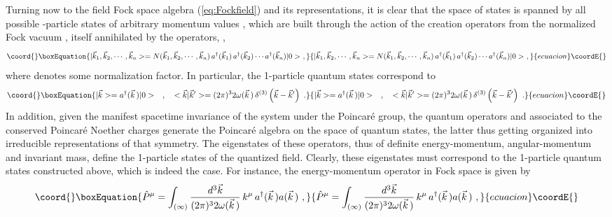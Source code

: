 \documentclass[a4paper,11pt]{article}
\begin{document}
Turning now to the field Fock space algebra (\ref{eq:Fockfield}) and
its representations, it is clear that the space of states is spanned
by all possible \coordHE{}-particle states \coordHE{} of arbitrary
momentum values \coordHE{}  \coordHE{}, which are built through the
action of the creation operators \coordHE{} from
the normalized Fock vacuum \coordHE{}, itself annihilated by the \coordHE{}
operators, \coordHE{}, 
\begin{equation}\coord{}\boxEquation{
|\vec{k}_1,\vec{k}_2,\cdots,\vec{k}_n>=
N(\vec{k}_1,\vec{k}_2,\cdots,\vec{k}_n)\,
a^\dagger(\vec{k}_1)\,a^\dagger(\vec{k}_2)\cdots a^\dagger(\vec{k}_n)|0>\ ,
}{
|\vec{k}_1,\vec{k}_2,\cdots,\vec{k}_n>=
N(\vec{k}_1,\vec{k}_2,\cdots,\vec{k}_n)\,
a^\dagger(\vec{k}_1)\,a^\dagger(\vec{k}_2)\cdots a^\dagger(\vec{k}_n)|0>\ ,
}{ecuacion}\coordE{}\end{equation}
where \coordHE{} denotes some normalization
factor. In particular, the 1-particle quantum states correspond to
\begin{equation}\coord{}\boxEquation{
|\vec{k}>=a^\dagger(\vec{k}\,)|0>\ \ \ ,\ \ \ 
<\vec{k}|\vec{k}'>=
(2\pi)^32\omega(\vec{k}\,)\,\delta^{(3)}\left(\vec{k}-\vec{k}'\right)\ .
}{
|\vec{k}>=a^\dagger(\vec{k}\,)|0>\ \ \ ,\ \ \ 
<\vec{k}|\vec{k}'>=
(2\pi)^32\omega(\vec{k}\,)\,\delta^{(3)}\left(\vec{k}-\vec{k}'\right)\ .
}{ecuacion}\coordE{}\end{equation}
In addition, given the manifest spacetime invariance of the system under
the Poincar\'e group, the quantum operators \coordHE{} and 
\myHighlight{$\hat{M}^{\mu\nu}$}\coordHE{} associated to the conserved Poincar\'e Noether charges
generate the Poincar\'e algebra on the space of quantum states, the latter
thus getting organized into irreducible representations of that symmetry.
The eigenstates of these operators, thus of de\-fi\-ni\-te energy-momentum, 
angular-momentum and invariant mass, define the 1-particle states
of the quantized field. Clearly, these eigenstates must correspond to
the 1-particle quantum states \myHighlight{$|\vec{k}>$}\coordHE{} constructed above, which is
indeed the case. For instance, the energy-momentum operator in Fock space
is given by
\begin{equation}\coord{}\boxEquation{
\hat{P}^\mu=\int_{(\infty)}\frac{d^3\vec{k}}{(2\pi)^32\omega(\vec{k}\,)}\,
k^\mu\,a^\dagger(\vec{k}\,)a(\vec{k}\,)\ ,
}{
\hat{P}^\mu=\int_{(\infty)}\frac{d^3\vec{k}}{(2\pi)^32\omega(\vec{k}\,)}\,
k^\mu\,a^\dagger(\vec{k}\,)a(\vec{k}\,)\ ,
}{ecuacion}\coordE{}\end{equation}
\end{document}
